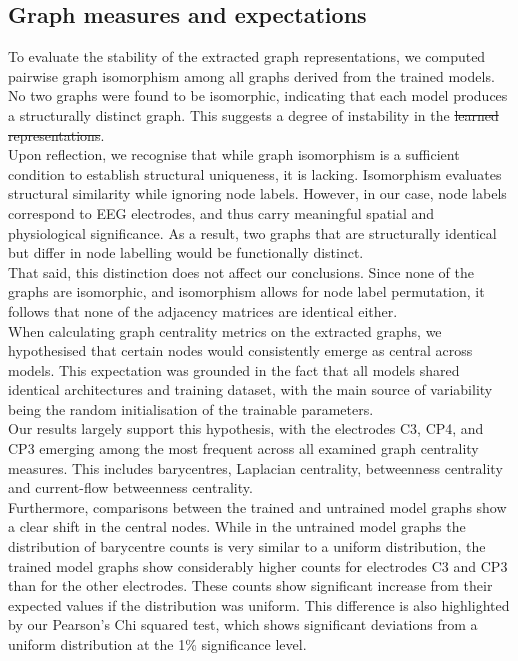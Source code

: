 \subsection{Graph measures and expectations}
To evaluate the stability of the extracted graph representations, we computed pairwise graph isomorphism among all graphs derived from the trained models. No two graphs were found to be isomorphic, indicating that each model produces a structurally distinct graph. This suggests a degree of instability in the \sout{learned representations}.
\vspace{0.5em}\\
Upon reflection, we recognise that while graph isomorphism is a sufficient condition to establish structural uniqueness, it is lacking. Isomorphism evaluates structural similarity while ignoring node labels. However, in our case, node labels correspond to EEG electrodes, and thus carry meaningful spatial and physiological significance. As a result, two graphs that are structurally identical but differ in node labelling would be functionally distinct.
\vspace{0.5em}\\
That said, this distinction does not affect our conclusions. Since none of the graphs are isomorphic, and isomorphism allows for node label permutation, it follows that none of the adjacency matrices are identical either.
\vspace{0.5em}\\
When calculating graph centrality metrics on the extracted graphs, we hypothesised that certain nodes would consistently emerge as central across models. This expectation was grounded in the fact that all models shared identical architectures and training dataset, with the main source of variability being the random initialisation of the trainable parameters.
\vspace{0.5em}\\
Our results largely support this hypothesis, with the electrodes C3, CP4, and CP3 emerging among the most frequent across all examined graph centrality measures. This includes barycentres, Laplacian centrality, betweenness centrality and current-flow betweenness centrality.
\vspace{0.5em}\\
Furthermore, comparisons between the trained and untrained model graphs show a clear shift in the central nodes. While in the untrained model graphs the distribution of barycentre counts is very similar to a uniform distribution, the trained model graphs show considerably higher counts for electrodes C3 and CP3 than for the other electrodes. These counts show significant increase from their expected values if the distribution was uniform. This difference is also highlighted by our Pearson's Chi squared test, which shows significant deviations from a uniform distribution at the 1\% significance level.

